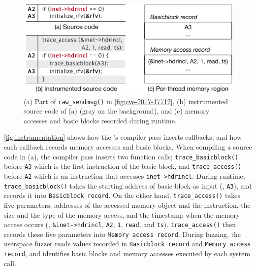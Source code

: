 \begin{figure}
  \centering
  \includegraphics[width=0.9\linewidth]{fig/instrumentation.pdf}
  \caption{(a) Part of \texttt{raw_sendmsg()} in
    \autoref{fig:cve-2017-17712}, (b) instrumented source code of (a)
    (gray on the background), and (c) memory accesses and basic blocks
    recorded during runtime.}
  \label{fig:instrumentation}
\end{figure}

\autoref{fig:instrumentation} shows how the \sys's compiler pass
inserts callbacks, and how each callback records memory accesses and
basic blocks.
%
When compiling a source code in (a), the compiler pass inserts two
function calls; \texttt{trace_basicblock()} before \texttt{A3} which
is the first instruction of the basic block, and
\texttt{trace_access()} before \texttt{A2} which is an instruction
that accesses \texttt{inet->hdrincl}.
%
During runtime, \texttt{trace_basicblock()} takes the starting address
of basic block as input (\ie, \texttt{A3}), and records it into
\texttt{Basicblock record}.
%
On the other hand, \texttt{trace_access()} takes five parameters,
addresses of the accessed memory object and the instruction, the size
and the type of the memory access, and the timestamp when the memory
access occurs (\ie, \texttt{\&inet->hdrincl}, \texttt{A2}, \texttt{1},
\texttt{read}, and \texttt{ts}).
%
\texttt{trace_access()} then records these five parameters into
\texttt{Memory access record}.
%
During fuzzing, the userspace fuzzer reads values recorded in
\texttt{Basicblock record} and \texttt{Memory access record}, and
identifies basic blocks and memory accesses executed by each system
call.












